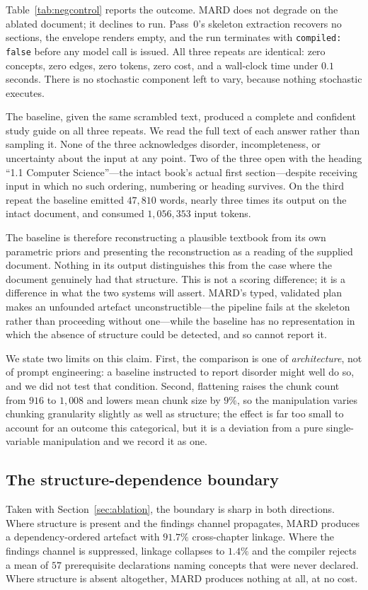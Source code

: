 \documentclass[conference]{IEEEtran}
\begin{document}
Table~\ref{tab:negcontrol} reports the outcome. MARD does not degrade on the
ablated document; it declines to run. Pass~0's
skeleton extraction recovers no sections, the envelope renders empty, and the
run terminates with \texttt{compiled: false} before any model call is issued.
All three repeats are identical: zero concepts, zero edges, zero tokens, zero
cost, and a wall-clock time under $0.1$ seconds. There is no stochastic
component left to vary, because nothing stochastic executes.

The baseline, given the same scrambled text, produced a complete and
confident study guide on all three repeats. We read the full text of each
answer rather than sampling it. None of the three acknowledges disorder,
incompleteness, or uncertainty about the input at any point. Two of the three
open with the heading ``1.1 Computer Science''---the intact book's actual
first section---despite receiving input in which no such ordering, numbering
or heading survives. On the third repeat the baseline emitted $47{,}810$
words, nearly three times its output on the intact document, and consumed
$1{,}056{,}353$ input tokens.

The baseline is therefore reconstructing a plausible textbook from its own
parametric priors and presenting the reconstruction as a reading of the
supplied document. Nothing in its output distinguishes this from the case
where the document genuinely had that structure. This is not a scoring
difference; it is a difference in what the two systems will assert. MARD's
typed, validated plan makes an unfounded artefact unconstructible---the
pipeline fails at the skeleton rather than proceeding without one---while the
baseline has no representation in which the absence of structure could be
detected, and so cannot report it.

We state two limits on this claim. First, the comparison is one of
\emph{architecture}, not of prompt engineering: a baseline instructed to
report disorder might well do so, and we did not test that condition. Second,
flattening raises the chunk count from $916$ to $1{,}008$ and lowers mean
chunk size by $9\%$, so the manipulation varies chunking granularity slightly
as well as structure; the effect is far too small to account for an outcome
this categorical, but it is a deviation from a pure single-variable
manipulation and we record it as one.

\subsection{The structure-dependence boundary}
Taken with Section~\ref{sec:ablation}, the boundary is sharp in both
directions. Where structure is present and the findings channel propagates,
MARD produces a dependency-ordered artefact with $91.7\%$ cross-chapter
linkage. Where the findings channel is suppressed, linkage collapses to
$1.4\%$ and the compiler rejects a mean of $57$ prerequisite declarations
naming concepts that were never declared. Where structure is absent
altogether, MARD produces nothing at all, at no cost.
\end{document}
